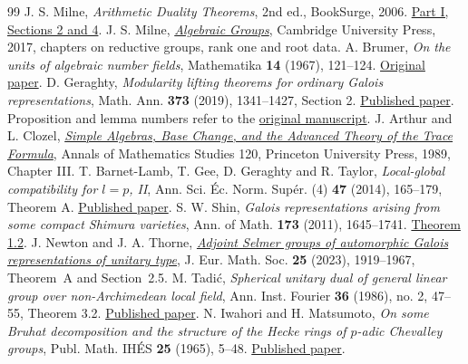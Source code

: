 \documentclass[a4paper,11pt]{article}
\theoremstyle{definition}
\theoremstyle{remark}
\numberwithin{equation}{section}
\begin{document}
\begingroup{}\begin{thebibliography}{99}\small
{} J. S. Milne, \emph{Arithmetic Duality Theorems}, 2nd ed., BookSurge, 2006. \href{https://www.jmilne.org/math/Books/ADTnot.pdf}{Part I, Sections 2 and 4}.
 J. S. Milne, \href{https://www.jmilne.org/math/Books/iAG2022.pdf}{\emph{Algebraic Groups}}, Cambridge University Press, 2017, chapters on reductive groups, rank one and root data.
 A. Brumer, \emph{On the units of algebraic number fields}, Mathematika \textbf{14} (1967), 121--124. \href{https://doi.org/10.1112/S0025579300003703}{Original paper}.
 D. Geraghty, \emph{Modularity lifting theorems for ordinary Galois representations}, Math. Ann. \textbf{373} (2019), 1341--1427, Section 2. \href{https://doi.org/10.1007/s00208-018-1742-4}{Published paper}. Proposition and lemma numbers refer to the \href{https://citeseerx.ist.psu.edu/document?doi=8faa2d675c94ae78d0ac8ebb3f9d4f69ede42d44\&repid=rep1\&type=pdf}{original manuscript}.
 J. Arthur and L. Clozel, \href{https://www.claymath.org/library/cw/arthur/pdf/30.pdf}{\emph{Simple Algebras, Base Change, and the Advanced Theory of the Trace Formula}}, Annals of Mathematics Studies 120, Princeton University Press, 1989, Chapter III.
 T. Barnet-Lamb, T. Gee, D. Geraghty and R. Taylor, \emph{Local-global compatibility for \(l=p\), II}, Ann. Sci. \'Ec. Norm. Sup\'er. (4) \textbf{47} (2014), 165--179, Theorem A. \href{https://www.numdam.org/articles/10.24033/asens.2212/}{Published paper}.
 S. W. Shin, \emph{Galois representations arising from some compact Shimura varieties}, Ann. of Math. \textbf{173} (2011), 1645--1741. \href{https://annals.math.princeton.edu/2011/173-3/p09}{Theorem 1.2}.
 J. Newton and J. A. Thorne, \href{https://arxiv.org/pdf/1912.11265}{\emph{Adjoint Selmer groups of automorphic Galois representations of unitary type}}, J. Eur. Math. Soc. \textbf{25} (2023), 1919--1967, Theorem~A and Section~2.5.
 M. Tadi\'c, \emph{Spherical unitary dual of general linear group over non-Archimedean local field}, Ann. Inst. Fourier \textbf{36} (1986), no. 2, 47--55, Theorem 3.2. \href{https://www.numdam.org/articles/10.5802/aif.1046/}{Published paper}.
 N. Iwahori and H. Matsumoto, \emph{On some Bruhat decomposition and the structure of the Hecke rings of \(p\)-adic Chevalley groups}, Publ. Math. IH\'ES \textbf{25} (1965), 5--48. \href{https://doi.org/10.1007/BF02684396}{Published paper}.

\end{thebibliography}
\end{document}
